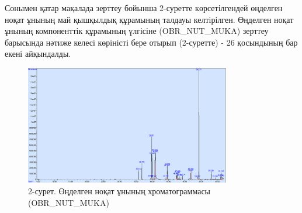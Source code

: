 \begin{multicols}{2}
Сонымен қатар мақалада зерттеу бойынша 2-суретте көрсетілгендей өңделген
ноқат ұнының май қышқылдық құрамының талдауы келтірілген. Өңделген ноқат
ұнының компоненттік құрамының үлгісіне (OBR\_NUT\_MUKA) зерттеу
барысында нәтиже келесі көріністі бере отырып (2-суретте) - 26
қосындының бар екені айқындалды.
\end{multicols}


\begin{figure}[H]
	\centering
	\includegraphics[width=0.8\textwidth]{media/pish/image14}
	\caption*{2-сурет. Өңделген ноқат ұнының хроматограммасы (OBR\_NUT\_MUKA)}
\end{figure}


